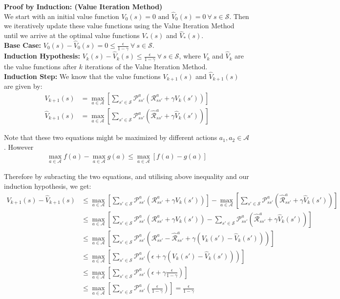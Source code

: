 \documentclass{article}
\renewcommand{\S}{\mathcal{S}}
\newcommand{\A}{\mathcal{A}}
\renewcommand{\P}{\mathcal{P}}
\newcommand{\R}{\mathcal{R}}
\newcommand{\Rhat}{\hat{\mathcal{R}}}
\begin{document}
\noindent
\textbf{Proof by Induction: (Value Iteration Method)} \\
We start with an initial value function $V_0(s) = 0 \text{ and } \hat{V}_0(s) = 0 \ \forall \ s \in \S$. Then we iteratively update these value functions using the Value Iteration Method until we arrive at the optimal value functions $V_*(s)$ and $\hat{V}_*(s)$. \\

\noindent
\textbf{Base Case:} $V_0(s)- \hat{V}_0(s) = 0 \leq \frac{\epsilon}{1 - \gamma} \ \forall \ s \in \S$. \\

\noindent
\textbf{Induction Hypothesis:} $V_k(s) - \hat{V}_k(s) \leq \frac{\epsilon}{1 - \gamma} \ \forall \ s \in \S$, where $V_k$ and $\hat{V}_k$ are the value functions after $k$ iterations of the Value Iteration Method. \\

\noindent
\textbf{Induction Step:} We know that the value functions $V_{k+1}(s)$ and $\hat{V}_{k+1}(s)$ are given by:
\begin{align}
	V_{k+1}(s) &= \max_{a \in \A} \left[\sum_{s' \in \S} \P^a_{ss'}\left(\R^a_{ss'} + \gamma V_k(s')\right) \right] \\
	\hat{V}_{k+1}(s) &= \max_{a \in \A} \left[\sum_{s' \in \S} \P^a_{ss'}\left(\Rhat^a_{ss'} + \gamma \hat{V}_k(s')\right) \right]
\end{align}

\noindent
Note that these two equations might be maximized by different actions $a_1, a_2 \in \A$. However
\begin{align}
	\max_{a \in \A} f(a) - \max_{a \in \A} g(a) \leq \max_{a \in \A} \left[ f(a) - g(a) \right]
\end{align}

\noindent
Therefore by subracting the two equations, and utilising above inequality and our induction hypothesis, we get:
\begin{align*}
	V_{k+1}(s) - \hat{V}_{k+1}(s) &\leq \max_{a \in \A} \left[\sum_{s' \in \S} \P^a_{ss'}\left(\R^a_{ss'} + \gamma V_k(s')\right) \right] - \max_{a \in \A} \left[\sum_{s' \in \S} \P^a_{ss'}\left(\Rhat^a_{ss'} + \gamma \hat{V}_k(s')\right) \right] \\
	&\leq \max_{a \in \A} \left[\sum_{s' \in \S} \P^a_{ss'}\left(\R^a_{ss'} + \gamma V_k(s')\right) - \sum_{s' \in \S} \P^a_{ss'}\left(\Rhat^a_{ss'} + \gamma \hat{V}_k(s')\right) \right] \\
	&\leq \max_{a \in \A} \left[\sum_{s' \in \S} \P^a_{ss'}\left(\R^a_{ss'} - \Rhat^a_{ss'} + \gamma \left( V_k(s') - \hat{V}_k(s') \right) \right) \right] \\
	&\leq \max_{a \in \A} \left[\sum_{s' \in \S} \P^a_{ss'}\left(\epsilon + \gamma \left( V_k(s') - \hat{V}_k(s') \right) \right) \right] \\
	&\leq \max_{a \in \A} \left[\sum_{s' \in \S} \P^a_{ss'}\left(\epsilon + \gamma \frac{\epsilon}{1 - \gamma} \right) \right] \\
	&\leq \max_{a \in \A} \left[\sum_{s' \in \S} \P^a_{ss'}\left(\frac{\epsilon}{1 - \gamma} \right) \right] 
	= \frac{\epsilon}{1 - \gamma}
\end{align*}
\end{document}
